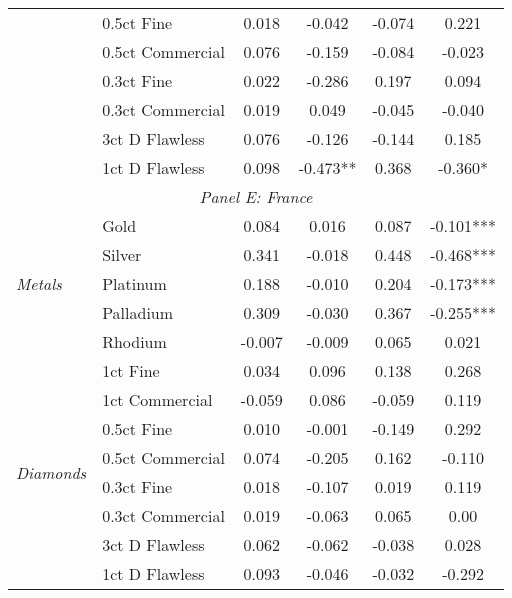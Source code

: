 \begin{tabularx}{1\textwidth}{Xlcccc}
								& 0.5ct Fine & 0.018 & -0.042 & -0.074 & 0.221 \\
								& 0.5ct Commercial & 0.076 & -0.159 & -0.084 & -0.023 \\
								& 0.3ct Fine & 0.022 & -0.286 & 0.197 & 0.094 \\
								& 0.3ct Commercial & 0.019 & 0.049 & -0.045 & -0.040 \\
								& 3ct D Flawless & 0.076 & -0.126 & -0.144 & 0.185 \\
								& 1ct D Flawless & 0.098 & -0.473** & 0.368 & -0.360* \\
\midrule
\multicolumn{6}{c}{\emph{Panel E: France}} \\
\multirow{5}{*}{\emph{Metals}}  & Gold & 0.084 & 0.016 & 0.087 & -0.101*** \\
								& Silver & 0.341 & -0.018 & 0.448 & -0.468*** \\
								& Platinum & 0.188 & -0.010 & 0.204 & -0.173*** \\
								& Palladium & 0.309 & -0.030 & 0.367 & -0.255*** \\
								& Rhodium & -0.007 & -0.009 & 0.065 & 0.021 \\
\cmidrule(l{0.25em}){2-6}
\multirow{8}{*}{\emph{Diamonds}} & 1ct Fine & 0.034 & 0.096 & 0.138 & 0.268 \\
								& 1ct Commercial & -0.059 & 0.086 & -0.059 & 0.119 \\
								& 0.5ct Fine & 0.010 & -0.001 & -0.149 & 0.292 \\
								& 0.5ct Commercial & 0.074 & -0.205 & 0.162 & -0.110 \\
								& 0.3ct Fine & 0.018 & -0.107 & 0.019 & 0.119 \\
								& 0.3ct Commercial & 0.019 & -0.063 & 0.065 & 0.00 \\
								& 3ct D Flawless & 0.062 & -0.062 & -0.038 & 0.028 \\
								& 1ct D Flawless & 0.093 & -0.046 & -0.032 & -0.292 \\
\bottomrule
\end{tabularx}